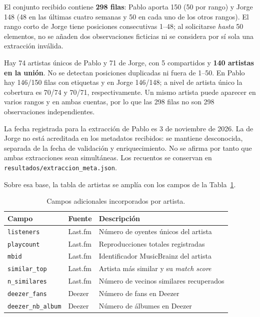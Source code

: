 El conjunto recibido contiene \textbf{298 filas}: Pablo aporta 150 (50 por rango) y Jorge 148 (48 en las últimas cuatro semanas y 50 en cada uno de los otros rangos). El rango corto de Jorge tiene posiciones consecutivas 1--48; al solicitarse \emph{hasta} 50 elementos, no se añaden dos observaciones ficticias ni se considera por sí sola una extracción inválida.

Hay 74 artistas únicos de Pablo y 71 de Jorge, con 5 compartidos y \textbf{140 artistas en la unión}. No se detectan posiciones duplicadas ni fuera de 1--50. En Pablo hay 146/150 filas con etiquetas y en Jorge 146/148; a nivel de artista único la cobertura es 70/74 y 70/71, respectivamente. Un mismo artista puede aparecer en varios rangos y en ambas cuentas, por lo que las 298 filas no son 298 observaciones independientes.

La fecha registrada para la extracción de Pablo es 3 de noviembre de 2026. La de Jorge no está acreditada en los metadatos recibidos: se mantiene desconocida, separada de la fecha de validación y enriquecimiento. No se afirma por tanto que ambas extracciones sean simultáneas. Los recuentos se conservan en \texttt{resultados/extraccion\_meta.json}.

Sobre esa base, la tabla de artistas se amplía con los campos de la Tabla~\ref{tab:campos-datos}.

\begin{table}[H]
    \centering
    \renewcommand{\arraystretch}{1.4}
    \caption{Campos adicionales incorporados por artista.}
    \label{tab:campos-datos}
    \small
    \begin{tabular}{|p{}|p{}|p{}|}
        \hline
        \textbf{Campo} & \textbf{Fuente} & \textbf{Descripción} \\
        \hline
        \texttt{listeners} & Last.fm & Número de oyentes únicos del artista \\
        \hline
        \texttt{playcount} & Last.fm & Reproducciones totales registradas \\
        \hline
        \texttt{mbid} & Last.fm & Identificador MusicBrainz del artista \\
        \hline
        \texttt{similar\_top} & Last.fm & Artista más similar y su \emph{match score} \\
        \hline
        \texttt{n\_similares} & Last.fm & Número de vecinos similares recuperados \\
        \hline
        \texttt{deezer\_fans} & Deezer & Número de fans en Deezer \\
        \hline
        \texttt{deezer\_nb\_album} & Deezer & Número de álbumes en Deezer \\
        \hline
    \end{tabular}
\end{table}

